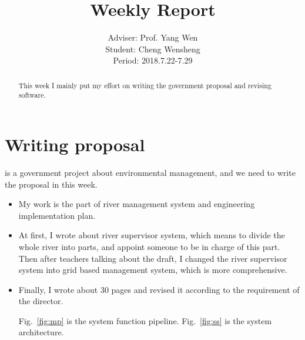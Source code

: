 \documentclass[]{IEEEtran}
\begin{document}
	\title{Weekly Report}
	\author{Adviser: Prof. Yang Wen \\Student: Cheng Wensheng\\ Period: 2018.7.22-7.29
	}
	\maketitle

\begin{abstract}
	This week I mainly put my effort on writing the government proposal and revising software.
\end{abstract}

\section{Writing proposal}
	 is a government project about environmental management, and we need to write the proposal in this week. 
	\begin{itemize}
		\item My work is the part of river management system and engineering implementation plan. 
		\item At first, I wrote about river supervisor system, which means to divide the whole river into parts, and appoint someone to be in charge of this part. Then after teachers talking about the draft, I changed the river supervisor system into grid based management system, which is more comprehensive.
		\item Finally, I wrote about 30 pages and revised it according to the requirement of the director.
		
		Fig.~\ref{fig:mp} is the system function pipeline. Fig.~\ref{fig:ss} is the system architecture.
	\end{itemize}

\end{document}

